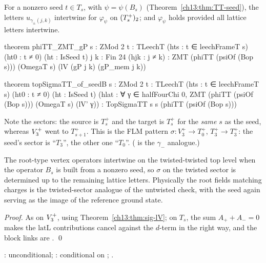 \begin{theorem}\label{ch13:thm:TT-root}
For a nonzero seed $t\in T_s$, with $\psi=\psi(B_s)$ (Theorem~\ref{ch13:thm:TT-seed}), the letters $u_{\gamma_\pm(j,k)}$
intertwine for $\varphi_\psi$ on $(T_{s}^{+})_2$; and  $\varphi_\psi$ holds provided all lattice
letters intertwine.
\end{theorem}
\begin{leancode}
theorem phiTT_ZMT_gP {s : ZMod 2} {t : TLeechT} (hts : t ∈ leechFrameT s) (ht0 : t ≠ 0) (ht : IsSeed t)
    {j k : Fin 24} (hjk : j ≠ k) :
    ZMT (phiTT (psiOf (Bop s))) (OmegaT s) (lV (gP j k) (gP_mem j k))

theorem topSigmaTT_of_seedB {s : ZMod 2} {t : TLeechT} (hts : t ∈ leechFrameT s) (ht0 : t ≠ 0)
    (ht : IsSeed t) (hlat : ∀ γ ∈ halfFourChi 0, ZMT (phiTT (psiOf (Bop s))) (OmegaT s) (lV' γ)) :
    TopSigmaTT s s (phiTT (psiOf (Bop s)))
\end{leancode}
\begin{dictionary}
Note the sectors: the source is $T_s^+$ and the target is $T_s^+$ for the \emph{same} $s$ as the seed, whereas
$V_3^{+}$ went to $T_{s+1}^+$. This is the FLM pattern $\sigma\colon V_3^+\to T_0^+$, $T_3^+\to T_3^+$: the seed's sector
is ``$T_3$'', the other one ``$T_0$''. ( is the $\gamma_-$ analogue.)
\end{dictionary}
\begin{physics}
The root-type vertex operators intertwine on the twisted-twisted top level when the operator $B_s$ is built from a nonzero seed, so $\sigma$ on the twisted sector is determined up to the remaining lattice letters. Physically the root fields matching charges is the twisted-sector analogue of the untwisted check, with the seed again serving as the image of the reference ground state.
\end{physics}
\noindent\emph{Proof.} As on $V_3^{+}$, using Theorem~\ref{ch13:thm:sig-lV}; on $T_s$, the sum $A_++A_-=0$ makes
the $\mathrm{latL}$ contributions cancel against the $d$-term in the right way, and the block links are
. \qed
\begin{status}: unconditional; : conditional on ;
.\end{status}

